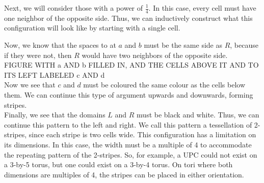 \documentclass[12pt]{article}
\theoremstyle{definition}
\theoremstyle{remark}
\theoremstyle{remark}
\begin{document}
\par
Next, we will consider those with a power of $\frac{1}{4}$. In this case, every cell must have one neighbor of the opposite side. Thus, we can inductively construct what this configuration will look like by starting with a single cell.
\begin{figure}[H]
\end{figure}
Now, we know that the spaces to at $a$ and $b$ must be the same side as $R$, because if they were not, then $R$ would have two neighbors of the opposite side.
\\
FIGURE WITH a AND b FILLED IN, AND THE CELLS ABOVE IT AND TO ITS LEFT LABELED c AND d
\\
Now we see that $c$ and $d$ must be coloured the same colour as the cells below them. We can continue this type of argument upwards and downwards, forming stripes.
\\
Finally, we see that the domains $L$ and $R$ must be black and white. Thus, we can continue this pattern to the left and right.
We call this pattern a tessellation of 2-stripes, since each stripe is two cells wide. This configuration has a limitation on its dimensions. In this case, the width must be a multiple of 4 to accommodate the repeating pattern of the 2-stripes. So, for example, a UPC could not exist on a 3-by-5 torus, but one could exist on a 3-by-4 torus. On tori where both dimensions are multiples of 4, the stripes can be placed in either orientation.
\end{document}
